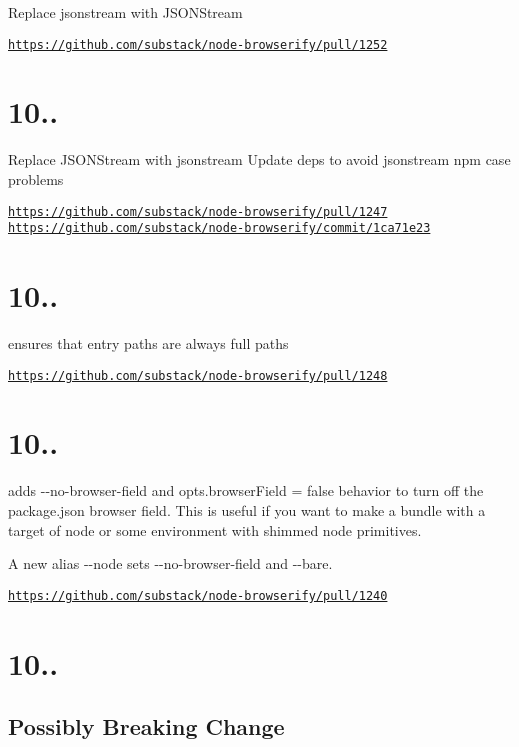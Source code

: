 Replace jsonstream with J\+S\+O\+N\+Stream

\href{https://github.com/substack/node-browserify/pull/1252}{\tt https\+://github.\+com/substack/node-\/browserify/pull/1252}

\section*{10..}

Replace J\+S\+O\+N\+Stream with jsonstream Update deps to avoid jsonstream npm case problems

\href{https://github.com/substack/node-browserify/pull/1247}{\tt https\+://github.\+com/substack/node-\/browserify/pull/1247} \href{https://github.com/substack/node-browserify/commit/1ca71e23}{\tt https\+://github.\+com/substack/node-\/browserify/commit/1ca71e23}

\section*{10..}

ensures that entry paths are always full paths

\href{https://github.com/substack/node-browserify/pull/1248}{\tt https\+://github.\+com/substack/node-\/browserify/pull/1248}

\section*{10..}

adds {\ttfamily -\/-\/no-\/browser-\/field} and {\ttfamily opts.\+browser\+Field = false} behavior to turn off the package.\+json browser field. This is useful if you want to make a bundle with a target of node or some environment with shimmed node primitives.

A new alias {\ttfamily -\/-\/node} sets {\ttfamily -\/-\/no-\/browser-\/field} and {\ttfamily -\/-\/bare}.

\href{https://github.com/substack/node-browserify/pull/1240}{\tt https\+://github.\+com/substack/node-\/browserify/pull/1240}

\section*{10..}

\subsection*{Possibly Breaking Change}

